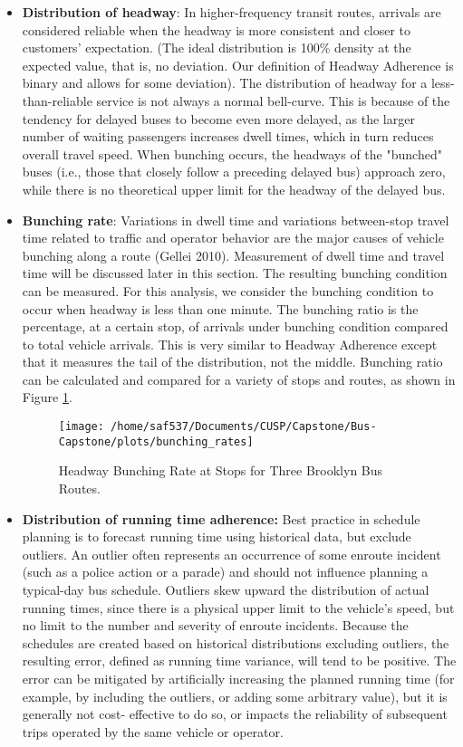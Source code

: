 \documentclass[12pt,journal,compsoc]{IEEEtran}
\begin{document}
\begin{itemize}
\item \textbf{Distribution of headway}: In higher-frequency transit routes, arrivals are considered reliable when the headway is more consistent and closer to customers' expectation.  (The ideal distribution is 100\% density at the expected value, that is, no deviation.  Our definition of Headway Adherence is binary and allows for some deviation).  The distribution of headway for a less-than-reliable service is not always a normal bell-curve.  This is because of the tendency for delayed buses to become even more delayed, as the larger number of waiting passengers increases dwell times, which in turn reduces overall travel speed.  When bunching occurs, the headways of the "bunched" buses (i.e., those that closely follow a preceding delayed bus) approach zero, while there is no theoretical upper limit for the headway of the delayed bus.
\item \textbf{Bunching rate}: Variations in dwell time and variations between-stop travel time related to traffic and operator behavior are the major causes of vehicle bunching along a route (Gellei 2010).  Measurement of dwell time and travel time will be discussed later in this section.  The resulting bunching condition can be measured.  For this analysis, we consider the bunching condition to occur when headway is less than one minute.  The bunching ratio is the percentage, at a certain stop, of arrivals under bunching condition compared to total vehicle arrivals.  This is very similar to Headway Adherence except that it measures the tail of the distribution, not the middle.  Bunching ratio can be calculated and compared for a variety of stops and routes, as shown in Figure \ref{bunch}.


\begin{figure}[!ht]
  \caption{Headway Bunching Rate at Stops for Three Brooklyn Bus Routes.}
  \label{bunch}
  \centering
    \texttt{[image: /home/saf537/Documents/CUSP/Capstone/Bus-Capstone/plots/bunching\_rates]}
\end{figure}



\item \textbf{Distribution of running time adherence:} Best practice in schedule planning is to forecast running time using historical data, but exclude outliers. An outlier often represents an occurrence of some enroute incident (such as a police action or a parade) and should not influence planning a typical-day bus schedule. Outliers skew upward the distribution of actual running times, since there is a physical upper limit to the vehicle's speed, but no limit to the number and severity of enroute incidents. Because the schedules are created based on historical distributions excluding outliers, the resulting error, defined as running time variance, will tend to be positive. The error can be mitigated by artificially increasing the planned running time (for example, by including the outliers, or adding some arbitrary value), but it is generally not cost- effective to do so, or impacts the reliability of subsequent trips operated by the same vehicle or operator.



\end{itemize}
\end{document}
